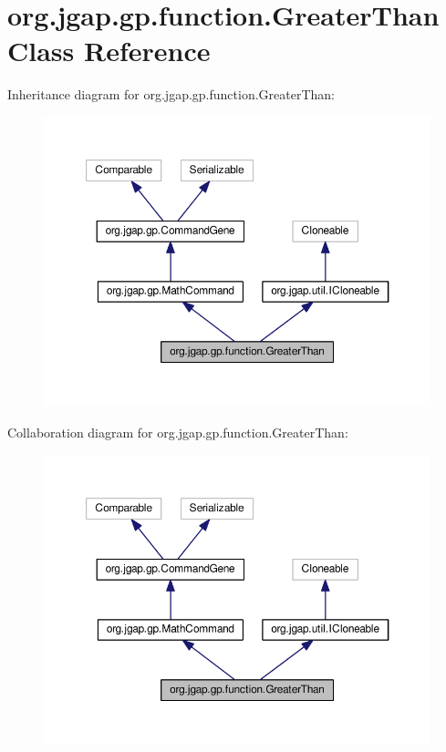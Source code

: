 \hypertarget{classorg_1_1jgap_1_1gp_1_1function_1_1_greater_than}{\section{org.\-jgap.\-gp.\-function.\-Greater\-Than Class Reference}
\label{classorg_1_1jgap_1_1gp_1_1function_1_1_greater_than}
}


Inheritance diagram for org.\-jgap.\-gp.\-function.\-Greater\-Than\-:
\nopagebreak
\begin{figure}[H]
\begin{center}
\leavevmode
\includegraphics[width=350pt]{classorg_1_1jgap_1_1gp_1_1function_1_1_greater_than__inherit__graph}
\end{center}
\end{figure}


Collaboration diagram for org.\-jgap.\-gp.\-function.\-Greater\-Than\-:
\nopagebreak
\begin{figure}[H]
\begin{center}
\leavevmode
\includegraphics[width=350pt]{classorg_1_1jgap_1_1gp_1_1function_1_1_greater_than__coll__graph}
\end{center}
\end{figure}
